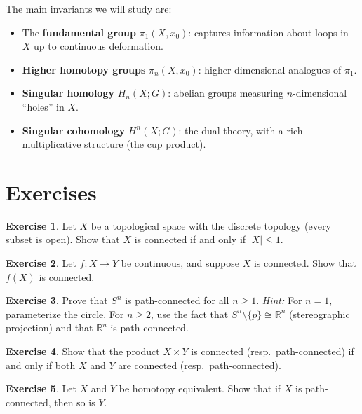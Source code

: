 \documentclass[12pt,a4paper,openany]{book}
\theoremstyle{definition}
\newtheorem{exercise}{Exercise}[chapter]
\theoremstyle{plain}
\theoremstyle{remark}
\newcommand{\R}{\mathbb{R}}
\newcommand{\abs}[1]{\left|#1\right|}
\begin{document}
The main invariants we will study are:
\begin{itemize}
\item The \textbf{fundamental group} $\pi_1(X, x_0)$: captures information about
  loops in $X$ up to continuous deformation.
\item \textbf{Higher homotopy groups} $\pi_n(X, x_0)$: higher-dimensional
  analogues of $\pi_1$.
\item \textbf{Singular homology} $H_n(X; G)$: abelian groups measuring
  $n$-dimensional ``holes'' in $X$.
\item \textbf{Singular cohomology} $H^n(X; G)$: the dual theory, with a rich
  multiplicative structure (the cup product).
\end{itemize}


\section{Exercises}\label{sec:ch1-exercises}

\begin{exercise}\label{exo:ch1-1}
Let $X$ be a topological space with the discrete topology (every subset is
open). Show that $X$ is connected if and only if $\abs{X} \le 1$.
\end{exercise}

\begin{exercise}\label{exo:ch1-2}
Let $f \colon X \to Y$ be continuous, and suppose $X$ is connected. Show that
$f(X)$ is connected.
\end{exercise}

\begin{exercise}\label{exo:ch1-3}
Prove that $S^n$ is path-connected for all $n \ge 1$.
\emph{Hint:} For $n = 1$, parameterize the circle. For $n \ge 2$, use the fact
that $S^n \setminus \{p\} \cong \R^n$ (stereographic projection) and that $\R^n$
is path-connected.
\end{exercise}

\begin{exercise}\label{exo:ch1-4}
Show that the product $X \times Y$ is connected (resp.\ path-connected) if and
only if both $X$ and $Y$ are connected (resp.\ path-connected).
\end{exercise}

\begin{exercise}\label{exo:ch1-5}
Let $X$ and $Y$ be homotopy equivalent. Show that if $X$ is path-connected,
then so is $Y$.
\end{exercise}
\end{document}
